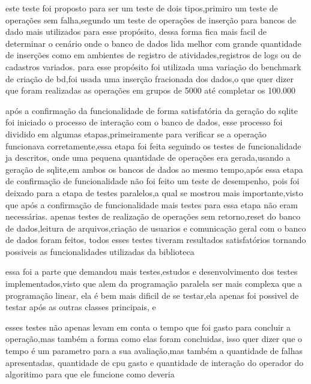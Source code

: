 \documentclass[
	12pt,				%
	openright,			%
	oneside,			%
	a4paper,			%
	english,			%
	french,				%
	spanish,			%
	brazil,				%
	]{abntex2}
\begin{document}
este teste foi proposto para ser um teste de dois tipos,primiro um teste de operações sem falha,segundo um teste de operações de inserção para bancos de dado mais utilizados para esse propósito,
dessa forma fica mais facil de determinar o cenário onde o banco de dados lida melhor com grande quantidade de inserções como em ambientes de registro de atividades,registros de logs ou de cadastros variados.
para esse propósito foi utilizada uma variação do benchmark de criação de bd,foi usada uma inserção fracionada dos dados,o que quer dizer que foram realizadas as operações em grupos de 5000 até completar os 100.000


após a confirmação da funcionalidade de forma satisfatória da geração do sqlite foi iniciado o processo de interação com o banco de dados,
esse processo foi dividido em algumas etapas,primeiramente para verificar se a operação funcionava corretamente,essa etapa foi feita seguindo os testes de funcionalidade ja descritos,
onde uma pequena quantidade de operações era gerada,usando a geração de sqlite,em ambos os bancos de dados ao mesmo tempo,após essa etapa de confirmação de funcionalidade não foi feito um teste de desempenho,
pois foi deixado para a etapa de testes paralelos,a qual se mostrou mais importante,visto que após a confirmação de funcionalidade mais testes para essa etapa não eram necessárias.
apenas testes de realização de operações sem retorno,reset do banco de dados,leitura de arquivos,criação de usuarios e comunicação geral com o banco de dados foram feitos,
todos esses testes tiveram resultados satisfatórios tornando possiveis as funcionalidades utilizadas da biblioteca 

essa foi a parte que demandou mais testes,estudos e desenvolvimento dos testes implementados,visto que alem da programação paralela ser mais complexa que a programação linear,
ela é bem mais dificil de se testar,ela apenas foi possivel de testar após as outras classes principais, e 

esses testes não apenas levam em conta o tempo que foi gasto para concluir a operação,mas também a forma como elas foram concluidas,
isso quer dizer que o tempo é um parametro para a sua avaliação,mas também a quantidade de falhas apresentadas,
quantidade de cpu gasto e quantidade de interação do operador do algoritimo para que ele funcione como deveria
\end{document}
